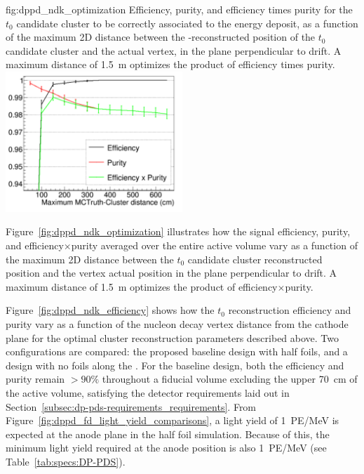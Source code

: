 \begin{dunefigure}{fig:dppd_ndk_optimization}
{Efficiency, purity, and efficiency times purity for the $t_0$ candidate cluster to be correctly associated to the  energy deposit, as a function of the maximum 2D distance between the -reconstructed position of the $t_0$ candidate cluster and the actual  vertex, in the plane perpendicular to drift. A maximum distance of \SI{1.5}{\m} optimizes the product of efficiency times purity.}
\includegraphics[width=0.5\textwidth]{graphics/dppd_ndk_optimization.pdf}
\end{dunefigure}

Figure~\ref{fig:dppd_ndk_optimization} illustrates how the  signal efficiency, purity, and efficiency$\times$purity averaged over the entire  active volume vary as a function of the maximum 2D distance between the $t_0$ candidate cluster reconstructed position and the  vertex actual position in the plane perpendicular to drift. A maximum distance of \SI{1.5}{\m} optimizes the product of efficiency$\times$purity. 

Figure~\ref{fig:dppd_ndk_efficiency} shows how the  $t_0$ reconstruction efficiency and purity vary as a function of the nucleon decay vertex distance from the cathode plane for the optimal cluster reconstruction parameters described above. Two configurations are compared: the proposed baseline design with half foils, and a design with no foils along the . For the baseline design, both the efficiency and purity remain $>90\%$ throughout a  fiducial volume excluding the upper \SI{70}{cm} of the  active volume, satisfying the detector requirements laid out in Section~\ref{subsec:dp-pds-requirements_requirements}. From Figure~\ref{fig:dppd_fd_light_yield_comparisons}, a light yield of \SI{1}{PE/\MeV} is expected at the anode plane in the half foil simulation. Because of this, the  minimum light yield required at the anode position is also \SI{1}{PE/\MeV} (see Table~\ref{tab:specs:DP-PDS}). 

